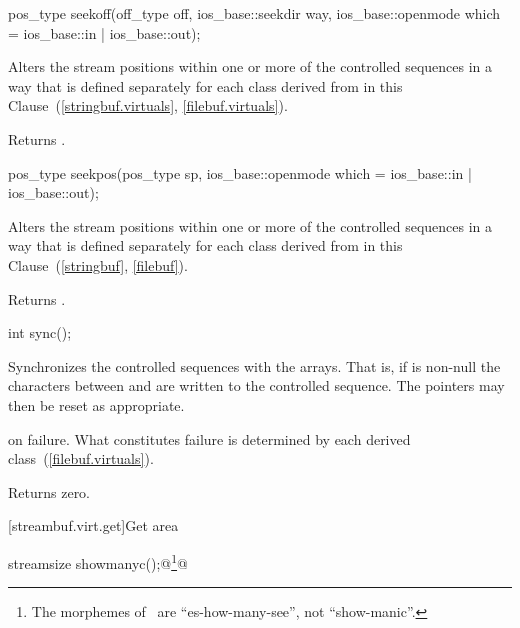 %
\begin{itemdecl}
pos_type seekoff(off_type off, ios_base::seekdir way,
                 ios_base::openmode which
                  = ios_base::in | ios_base::out);
\end{itemdecl}

\begin{itemdescr}
\pnum
\effects
Alters the stream positions within one or more of
the controlled sequences in a way that is defined separately for each class
derived from
in this Clause~(\ref{stringbuf.virtuals},
\ref{filebuf.virtuals}).

\pnum
{}
Returns
.
\end{itemdescr}

%
\begin{itemdecl}
pos_type seekpos(pos_type sp,
                 ios_base::openmode which
                  = ios_base::in | ios_base::out);
\end{itemdecl}

\begin{itemdescr}
\pnum
\effects
Alters the stream positions within one or more of
the controlled sequences in a way that is defined separately for each class
derived from
in this Clause~(\ref{stringbuf},
\ref{filebuf}).

\pnum
{}
Returns
.
\end{itemdescr}

%
\begin{itemdecl}
int sync();
\end{itemdecl}

\begin{itemdescr}
\pnum
\effects
Synchronizes the controlled sequences with the arrays.
That is, if
is non-null the characters between
and
are written to the controlled sequence.
The pointers may then be reset as appropriate.

\pnum
\returns
{} on failure.
What constitutes failure is determined by each derived class~(\ref{filebuf.virtuals}).

\pnum
{}
Returns zero.
\end{itemdescr}

[streambuf.virt.get]{Get area}

%
\begin{itemdecl}
streamsize showmanyc();@\footnote{\textrm{The morphemes of \
are ``es-how-many-see'', not ``show-manic''.}}@
\end{itemdecl}

